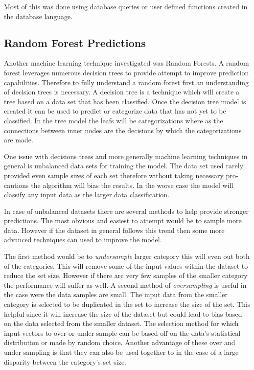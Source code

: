 
Most of this was done using database queries or user defined functions created in the database language.

\subsection{Random Forest Predictions}

Another machine learning technique investigated was Random Forests. A random forest leverages numerous decision trees to provide attempt to improve prediction capabilities. Therefore to fully understand a random forest first an understanding of decision trees is necessary. A decision tree is a technique which will create a tree based on a data set that has been classified. Once the decision tree model is created it can be used to predict or categorize data that has not yet to be classified. In the tree model the leafs will be categorizations where as the connections between inner nodes are the decisions by which the categorizations are made.

One issue with decisions trees and more generally machine learning techniques in general is unbalanced data sets for training the model. The data set used rarely provided even sample sizes of each set therefore without taking necessary pro-cautions the algorithm will bias the results. In the worse case the model will classify any input data as the larger data classification.

In case of unbalanced datasets there are several methods to help provide stronger predictions. The most obvious and easiest to attempt would be to sample more data. However if the dataset in general follows this trend then some more advanced techniques can used to improve the model.

 
The first method would be to \textit{undersample} larger category this will even out both of the categories. This will remove some of the input values within the dataset to reduce the set size. However if there are very few samples of the smaller category the performance will suffer as well. A second method of \textit{oversampling} is useful in the case were the data samples are small. The input data from the smaller category is selected to be duplicated in the set to increase the size of the set. This helpful since it will increase the size of the dataset but could lead to bias based on the data selected from the smaller dataset. The selection method for which input vectors to over or under sample can be based off on the data's statistical distribution or made by random choice. Another advantage of these over and under sampling is that they can also be used together to in the case of a large disparity between the category's set size. 

